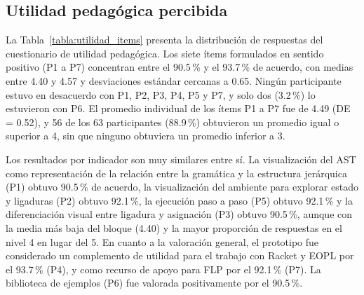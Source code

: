 \FloatBarrier

\subsection{Utilidad pedagógica percibida}

La Tabla~\ref{tabla:utilidad_items} presenta la distribución de respuestas del cuestionario de utilidad pedagógica. Los siete ítems formulados en sentido positivo (P1 a P7) concentran entre el 90.5\,\% y el 93.7\,\% de acuerdo, con medias entre 4.40 y 4.57 y desviaciones estándar cercanas a 0.65. Ningún participante estuvo en desacuerdo con P1, P2, P3, P4, P5 y P7, y solo dos (3.2\,\%) lo estuvieron con P6. El promedio individual de los ítems P1 a P7 fue de 4.49 (DE = 0.52), y 56 de los 63 participantes (88.9\,\%) obtuvieron un promedio igual o superior a 4, sin que ninguno obtuviera un promedio inferior a 3.

Los resultados por indicador son muy similares entre sí. La visualización del AST como representación de la relación entre la gramática y la estructura jerárquica (P1) obtuvo 90.5\,\% de acuerdo, la visualización del ambiente para explorar estado y ligaduras (P2) obtuvo 92.1\,\%, la ejecución paso a paso (P5) obtuvo 92.1\,\% y la diferenciación visual entre ligadura y asignación (P3) obtuvo 90.5\,\%, aunque con la media más baja del bloque (4.40) y la mayor proporción de respuestas en el nivel 4 en lugar del 5. En cuanto a la valoración general, el prototipo fue considerado un complemento de utilidad para el trabajo con Racket y EOPL por el 93.7\,\% (P4), y como recurso de apoyo para FLP por el 92.1\,\% (P7). La biblioteca de ejemplos (P6) fue valorada positivamente por el 90.5\,\%.

